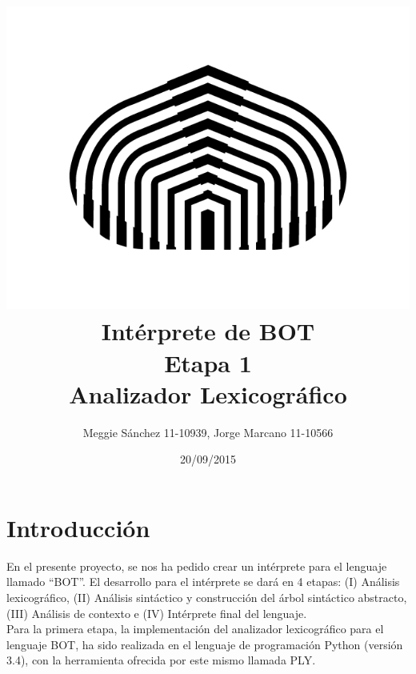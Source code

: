 \documentclass{article}
\title{}
\author{}
\date{}
\begin{document}
\vspace{1.5cm}
 
\title{ \includegraphics[scale=0.3]{usb}  \\ Intérprete de BOT \\ Etapa 1 \\ Analizador Lexicográfico }

\author{Meggie Sánchez 11-10939, Jorge Marcano 11-10566} 

\date{20/09/2015}

\maketitle

\newpage

\section{Introducción}
\hspace{0.5cm} 	En el presente proyecto, se nos ha pedido crear un intérprete para el lenguaje llamado “BOT”. El desarrollo para el intérprete se dará en 4 etapas: (I) Análisis lexicográfico, (II) Análisis sintáctico y construcción del árbol sintáctico abstracto, (III) Análisis de contexto e (IV) Intérprete final del lenguaje. \\

Para la primera etapa, la implementación del analizador lexicográfico para el lenguaje BOT, ha sido realizada en el lenguaje de programación Python (versión 3.4), con la herramienta ofrecida por este mismo llamada PLY. 
\end{document}
